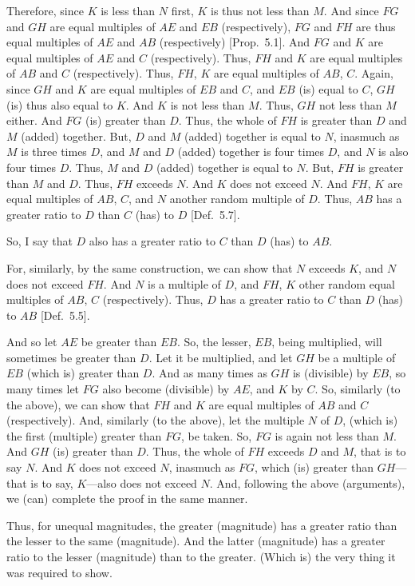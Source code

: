 \begin{Parallel}{}{}
{Therefore, since $K$ is less than $N$ first, $K$ is thus not less than $M$.
And since $FG$ and $GH$ are equal multiples of $AE$ and $EB$ (respectively),
$FG$ and $FH$ are thus equal multiples of $AE$ and $AB$ (respectively) [Prop.~5.1].
And $FG$ and $K$ are equal multiples of $AE$ and $C$ (respectively).
Thus, $FH$ and $K$ are equal multiples of $AB$ and $C$ (respectively).
Thus, $FH$, $K$ are equal multiples of $AB$, $C$. Again, since $GH$ and 
$K$ are equal
multiples of $EB$ and $C$, and $EB$ (is) equal to $C$, $GH$ (is) thus also equal to
$K$. And $K$ is not less than $M$. Thus, $GH$ not less than $M$ either. And $FG$
(is) greater than $D$. Thus, the whole of $FH$ is greater than $D$
and $M$ (added) together. But, $D$ and $M$ (added) together is equal to $N$, 
inasmuch as $M$ is three times $D$, and $M$ and $D$ (added) together is four
times $D$, and $N$ is also four times $D$. Thus, $M$ and $D$ (added) together is
equal to $N$. But, $FH$ is greater than $M$ and $D$. Thus, $FH$ exceeds $N$. And $K$ does not exceed $N$. 
And $FH$, $K$  are equal multiples of $AB$, $C$, and $N$ another random multiple
of $D$. Thus, $AB$ has a greater ratio to $D$  than $C$ (has) to $D$ [Def.~5.7].

So, I say that $D$ also has a greater ratio to $C$ than $D$ (has) to $AB$.

For, similarly, by the same construction, we can show that 
$N$ exceeds $K$, and $N$ does not exceed $FH$. And $N$ is a multiple of $D$,
and $FH$, $K$ other  random  equal multiples of $AB$, $C$ (respectively). Thus, $D$ has a greater
ratio to  $C$ than $D$ (has) to $AB$ [Def.~5.5].

And so let $AE$ be greater than $EB$. So, the lesser, $EB$, being multiplied, will
sometimes be greater than $D$. Let it be multiplied, and let $GH$ be
a multiple of $EB$ (which is) greater than $D$. And as many times as $GH$ is
(divisible) by $EB$, so many times let $FG$ also  become (divisible) by $AE$,
and $K$ by $C$. So, similarly (to the above), we can show that $FH$ and $K$ are equal multiples of
$AB$ and $C$ (respectively). And, similarly (to the above), let the multiple $N$ of $D$,  (which is)
the first (multiple) greater than $FG$, be taken. So,  $FG$ is again not less than $M$.
And $GH$ (is) greater than $D$. Thus, the whole of $FH$ exceeds $D$ and $M$, that is to say $N$.  And $K$ does not exceed $N$, inasmuch as $FG$, which (is) greater than
$GH$---that is to say, $K$---also does not exceed $N$. And, following the above (arguments), we  (can) complete the proof in the same manner.

Thus, for unequal magnitudes, the greater (magnitude) has a greater
ratio  than the lesser to the same (magnitude). And the latter (magnitude)
has a greater ratio to the lesser (magnitude) than to the greater. (Which is)
the very thing it was required to show.}
\end{Parallel}


